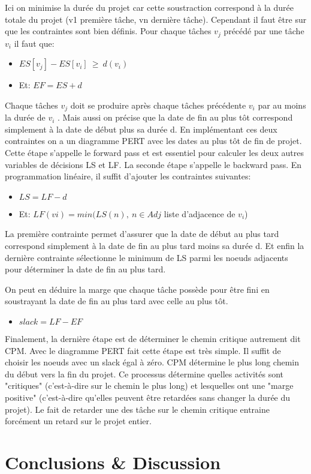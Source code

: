 \documentclass{article}
\begin{document}
\newline
Ici on minimise la durée du projet car cette soustraction correspond à la durée totale du projet (v1 première tâche, vn dernière tâche). Cependant il faut être sur que les contraintes sont bien définis. Pour chaque tâches $v_j$ précédé par une tâche $v_i$ il faut que: 
\begin{itemize}

\item[] $ES[v_j] - ES[v_i]\  \geq \  d(v_i)$
\item[] Et: $EF = ES + d$

\end{itemize}

Chaque tâches $v_j$ doit se produire après chaque tâches précédente $v_i$ par au moins la durée de $v_i$ . Mais aussi on précise que la date de fin au plus tôt correspond simplement à la date de début plus sa durée d. En implémentant ces deux contraintes on a un diagramme PERT avec les dates au plus tôt de fin de projet. Cette étape s’appelle le forward pass et est essentiel pour calculer les deux autres variables de décisions LS et LF. La seconde étape s’appelle le backward pass. En programmation linéaire, il suffit d’ajouter les contraintes suivantes:

\begin{itemize}

\item[] $LS = LF - d$
\item[] Et: $LF(vi) = min(LS(n) , \ n \in Adj $ liste d'adjacence de $v_i$)


\end{itemize}
La première contrainte permet d’assurer que la date de début au plus tard correspond simplement à la date de fin au plus tard moins sa durée d. Et enfin la dernière contrainte sélectionne le minimum de LS parmi les noeuds adjacents pour déterminer la date de fin au plus tard. 

On peut en déduire la marge que chaque tâche possède pour être fini en soustrayant la date de fin au plus tard avec celle au plus tôt.

\begin{itemize}
\item[] $slack = LF - EF$
\end{itemize}

Finalement, la dernière étape est de déterminer le chemin critique autrement dit CPM. Avec le diagramme PERT fait cette étape est très simple. Il suffit de choisir les noeuds avec un slack égal à zéro. CPM détermine le plus long chemin du début vers la fin du projet. Ce processus détermine quelles activités sont "critiques" (c'est-à-dire sur le chemin le plus long) et lesquelles ont une "marge positive" (c'est-à-dire qu'elles peuvent être retardées sans changer la durée du projet). Le fait de retarder une des tâche sur le chemin critique entraine forcément un retard sur le projet entier.
 




\section{Conclusions \& Discussion}\label{conclusions}


\begin{thebibliography}\end{thebibliography}
\end{document}
